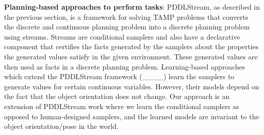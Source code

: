  
\textbf{Planning-based approaches to perform tasks}: PDDLStream, as described in the previous section, is a framework for solving TAMP problems that converts the discrete and continuous planning problem into a discrete planning problem using streams. Streams are conditional samplers and also have a declarative component that certifies the facts generated by the samplers about the properties the generated values satisfy in the given environment. These generated values are then used as facts in a discrete planning problem. Learning-based approaches which extend the PDDLStream framework (____) learn the samplers to generate values for certain continuous variables. However, their models depend on the fact that the object orientation does not change. Our approach is an extension of PDDLStream work where we learn the conditional samplers as opposed to human-designed samplers, and the learned models are invariant to the object orientation/pose in the world. 



